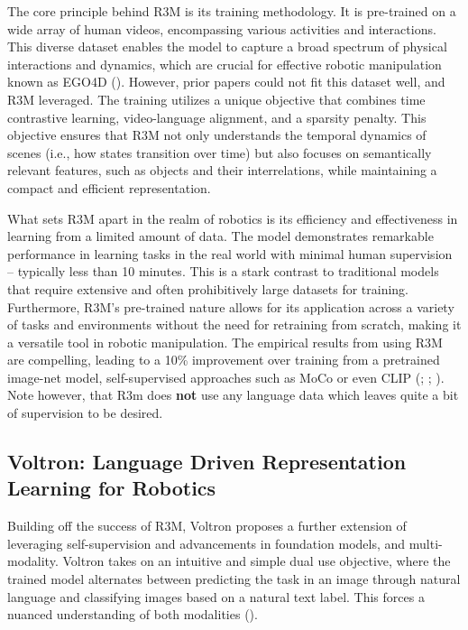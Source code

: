 \documentclass[
  letterpaper,
  numbers=noenddot,
  DIV=11,
  oneside]{scrreprt}
\theoremstyle{remark}
\begin{document}
The core principle behind R3M is its training methodology. It is
pre-trained on a wide array of human videos, encompassing various
activities and interactions. This diverse dataset enables the model to
capture a broad spectrum of physical interactions and dynamics, which
are crucial for effective robotic manipulation known as EGO4D
(). However, prior
papers could not fit this dataset well, and R3M leveraged. The training
utilizes a unique objective that combines time contrastive learning,
video-language alignment, and a sparsity penalty. This objective ensures
that R3M not only understands the temporal dynamics of scenes (i.e., how
states transition over time) but also focuses on semantically relevant
features, such as objects and their interrelations, while maintaining a
compact and efficient representation.

What sets R3M apart in the realm of robotics is its efficiency and
effectiveness in learning from a limited amount of data. The model
demonstrates remarkable performance in learning tasks in the real world
with minimal human supervision -- typically less than 10 minutes. This
is a stark contrast to traditional models that require extensive and
often prohibitively large datasets for training. Furthermore, R3M's
pre-trained nature allows for its application across a variety of tasks
and environments without the need for retraining from scratch, making it
a versatile tool in robotic manipulation. The empirical results from
using R3M are compelling, leading to a 10\% improvement over training
from a pretrained image-net model, self-supervised approaches such as
MoCo or even CLIP (;
;
). Note however,
that R3m does \textbf{not} use any language data which leaves quite a
bit of supervision to be desired.

\subsection{Voltron: Language Driven Representation Learning for
Robotics}\label{voltron-language-driven-representation-learning-for-robotics}

Building off the success of R3M, Voltron proposes a further extension of
leveraging self-supervision and advancements in foundation models, and
multi-modality. Voltron takes on an intuitive and simple dual use
objective, where the trained model alternates between predicting the
task in an image through natural language and classifying images based
on a natural text label. This forces a nuanced understanding of both
modalities ().
\end{document}
